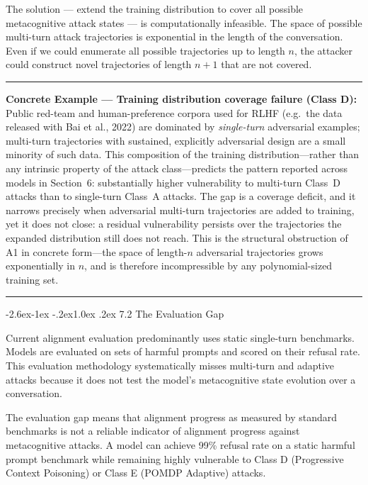 \documentclass[
  11pt,
]{article}
\makeatletter
\renewcommand\subsection{\@startsection{subsection}{2}{\z@}%
  {-2.6ex\@plus -1ex \@minus -.2ex}{1.0ex \@plus .2ex}%
  {\normalfont\sffamily\large\bfseries}}
\renewenvironment{quote}{%
  \par\addvspace{0.7em}%
  \noindent\rule{\linewidth}{1.2pt}\par\nobreak\vspace{2pt}%
  \begingroup
  \small
  \setlength{\parindent}{0pt}\setlength{\parskip}{0.3em}%
  \setlength{\leftskip}{0.9em}\setlength{\rightskip}{0.4em}%
  \ignorespaces
}{%
  \par\endgroup\vspace{2pt}%
  \noindent\rule{\linewidth}{0.4pt}\par\addvspace{0.7em}%
}
\makeatother
\begin{document}
The solution --- extend the training distribution to cover all possible
metacognitive attack states --- is computationally infeasible. The space
of possible multi-turn attack trajectories is exponential in the length
of the conversation. Even if we could enumerate all possible
trajectories up to length \(n\), the attacker could construct novel
trajectories of length \(n+1\) that are not covered.

\begin{quote}
\textbf{Concrete Example --- Training distribution coverage failure
(Class D):} Public red-team and human-preference corpora used for RLHF
(e.g.\ the data released with Bai et al., 2022) are dominated by
\emph{single-turn} adversarial examples; multi-turn trajectories with
sustained, explicitly adversarial design are a small minority of such
data. This composition of the training distribution---rather than any
intrinsic property of the attack class---predicts the pattern reported
across models in Section~6: substantially higher vulnerability to
multi-turn Class~D attacks than to single-turn Class~A attacks. The
gap is a coverage deficit, and it narrows precisely when adversarial
multi-turn trajectories are added to training, yet it does not close: a
residual vulnerability persists over the trajectories the expanded
distribution still does not reach. This is the structural obstruction
of A1 in concrete form---the space of length-\(n\) adversarial
trajectories grows exponentially in \(n\), and is therefore
incompressible by any polynomial-sized training set.
\end{quote}

\subsection{7.2 The Evaluation Gap}\label{the-evaluation-gap}

Current alignment evaluation predominantly uses static single-turn
benchmarks. Models are evaluated on sets of harmful prompts and scored
on their refusal rate. This evaluation methodology systematically misses
multi-turn and adaptive attacks because it does not test the model's
metacognitive state evolution over a conversation.

The evaluation gap means that alignment progress as measured by standard
benchmarks is not a reliable indicator of alignment progress against
metacognitive attacks. A model can achieve 99\% refusal rate on a static
harmful prompt benchmark while remaining highly vulnerable to Class D
(Progressive Context Poisoning) or Class E (POMDP Adaptive) attacks.
\end{document}
